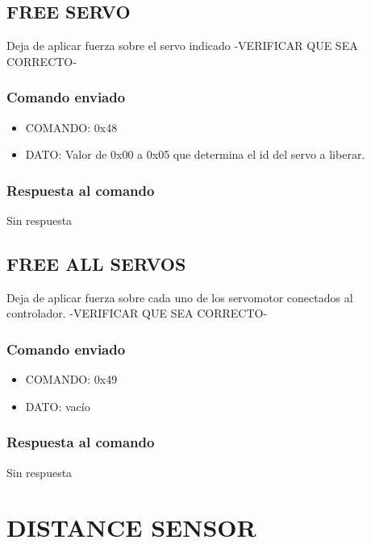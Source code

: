 \documentclass[a4paper,10pt]{article}
\begin{document}
\subsection{FREE SERVO}
\label{free_servo}

Deja de aplicar fuerza sobre el servo indicado -VERIFICAR QUE SEA CORRECTO-

\subsubsection*{Comando enviado}

\begin{itemize}
	\item{COMANDO:} 0x48
	\item{DATO:} Valor de 0x00 a 0x05 que determina el id del servo a liberar.
\end{itemize}

\subsubsection*{Respuesta al comando}

Sin respuesta

\subsection{FREE ALL SERVOS}
\label{free_all_servos}

Deja de aplicar fuerza sobre cada uno de los servomotor conectados al controlador. -VERIFICAR QUE SEA CORRECTO-

\subsubsection*{Comando enviado}

\begin{itemize}
	\item{COMANDO:} 0x49
	\item{DATO:} vac\'io
\end{itemize}

\subsubsection*{Respuesta al comando}

Sin respuesta

\section{DISTANCE SENSOR} 
\label{grupo_distance_sensor}
\end{document}
